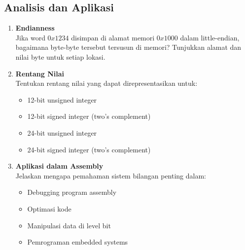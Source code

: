 \documentclass[../main.tex]{subfiles}
\begin{document}
\subsection{Analisis dan Aplikasi}

\begin{enumerate}
    \item \textbf{Endianness}\\
    Jika word \(0x1234\) disimpan di alamat memori \(0x1000\) dalam little-endian, bagaimana byte-byte tersebut tersusun di memori? Tunjukkan alamat dan nilai byte untuk setiap lokasi.

    \item \textbf{Rentang Nilai}\\
    Tentukan rentang nilai yang dapat direpresentasikan untuk:
    \begin{itemize}
        \item 12-bit unsigned integer
        \item 12-bit signed integer (two's complement)
        \item 24-bit unsigned integer
        \item 24-bit signed integer (two's complement)
    \end{itemize}

    \item \textbf{Aplikasi dalam Assembly}\\
    Jelaskan mengapa pemahaman sistem bilangan penting dalam:
    \begin{itemize}
        \item Debugging program assembly
        \item Optimasi kode
        \item Manipulasi data di level bit
        \item Pemrograman embedded systems
    \end{itemize}
\end{enumerate}
\end{document}
